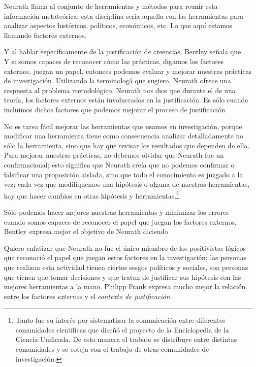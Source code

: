 Neurath llama  al conjunto de herramientas y métodos para reunir esta información metateórica; 
esta disciplina sería aquella con las herramientas para analizar aspectos históricos, políticos, económicos, etc.
Lo que aquí estamos llamando factores externos.

Y al hablar específicamente de la justificación de creencias, Bentley señala que  \parencite[p.~41]{Bentley2023}.
Y si somos capaces de reconocer cómo las prácticas, digamos los factores externos,  juegan un papel, entonces podemos evaluar y mejorar nuestras prácticas de investigación.
Utilizando la terminologá que sugiero, Neurath ofrece una respuesta al problema metodológico.
Neurath nos dice que durante el  de una teoría, los factores externos están involucrados en la justificación.
Es sólo cuando incluimos dichos factores que podemos mejorar el proceso de justificación

No es tarea fácil mejorar las herramientas que usamos en investigación, porque modificar una herramienta tiene como consecuencia analizar detalladamente no sólo la herramienta, sino que hay que revisar los resultados que dependen de ella.
Para mejorar nuestras prácticas, no debemos olvidar que Neurath fue un  confirmacional; esto significa que Neurath creía que no podemos confirmar o falsificar una proposición aislada, sino que todo el conocimiento es juzgado a la vez; 
cada vez que modifiquemos una hipótesis o alguna de nuestras herramientas, hay que hacer cambios en otras hipótesis y herramientas.\footnote{
	Tanto fue su interés por sistematizar la comunicación entre diferentes comunidades científicas que diseñó el proyecto de la Enciclopedia de la  Ciencia Unificada.
	De esta manera el trabajo se distribuye entre distintas comunidades y se coteja con el trabajo de otras comunidades de investigación.
	}

Sólo podemos hacer mejores nuestras herramientas y minimizar los errores cuando somos capaces de reconocer el papel que juegan los factores externos, Bentley expresa mejor el objetivo de Neurath diciendo  \parencite[p.~41]{Bentley2023}

Quiero enfatizar que Neurath no fue el único miembro de los positivistas lógicos que reconoció el papel que juegan estos factores en la investigación;
las personas que realizan esta actividad tienen ciertos sesgos políticos y sociales, son personas que tienen que tomar decisiones y que tratan de justificar sus hipótesis con las mejores herramientas a la mano.
Philipp Frank expresa mucho mejor la relación entre los factores \emph{externos} y el \emph{contexto de justificación.}



